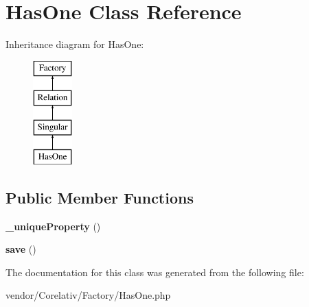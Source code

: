 \hypertarget{classHasOne}{
\section{HasOne Class Reference}
\label{classHasOne}
}
Inheritance diagram for HasOne:\begin{figure}[H]
\begin{center}
\leavevmode
\includegraphics[height=4.000000cm]{classHasOne}
\end{center}
\end{figure}
\subsection*{Public Member Functions}
\begin{DoxyCompactItemize}
\item 
\hypertarget{classHasOne_ae455d97029d3bde54383c6988e1eaf9f}{
{\bfseries \_\-uniqueProperty} ()}
\label{classHasOne_ae455d97029d3bde54383c6988e1eaf9f}

\item 
\hypertarget{classHasOne_a582bb97d9efff35f8b9aeedd8ca52475}{
{\bfseries save} ()}
\label{classHasOne_a582bb97d9efff35f8b9aeedd8ca52475}

\end{DoxyCompactItemize}


The documentation for this class was generated from the following file:\begin{DoxyCompactItemize}
\item 
vendor/Corelativ/Factory/HasOne.php\end{DoxyCompactItemize}
